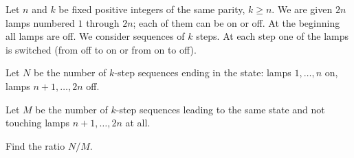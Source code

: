 Let $n$ and $k$ be fixed positive integers of the same parity, $k \geq n$. We are given $2n$ lamps numbered $1$ through $2n$; each of them can be on or off. At the beginning all lamps are off. We consider sequences of $k$ steps. At each step one of the lamps is switched (from off to on or from on to off).

Let $N$ be the number of $k$-step sequences ending in the state: lamps $1, \ldots, n$ on, lamps $n+1, \ldots, 2n$ off.

Let $M$ be the number of $k$-step sequences leading to the same state and not touching lamps $n+1, \ldots, 2n$ at all.

Find the ratio $N/M$.
